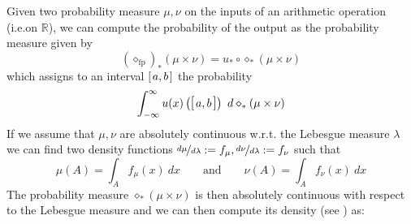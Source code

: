 \documentclass[10pt,a4paper]{article}
\theoremstyle{plain}
\theoremstyle{definition}
\newcommand{\R}{\mathbb{R}}
\newcommand{\intvl}[1]{\mathlarger{\left[\right.}  #1 \mathlarger{\left.\right]}}
\newcommand{\fp}{_{\mathrm{fp}}}
\begin{document}
Given two probability measure $\mu,\nu$ on the inputs of an arithmetic operation (i.e.\@ on $\R$), we can compute the probability of the output as the probability measure given by
\[
(\diamond\fp)_\ast(\mu\times\nu)=u_\ast\circ \diamond_\ast (\mu\times \nu)
\]
which assigns to an interval $\intvl{a,b}$ the probability
\begin{equation}\label{eq:noisyoperation}
\int_{-\infty}^{\infty} u(x)\left(\intvl{a,b}\right) ~d\diamond_\ast(\mu\times \nu)
\end{equation}
If we assume that $\mu,\nu$ are absolutely continuous w.r.t. the Lebesgue measure $\lambda$ we can find two density functions $\nicefrac{d\mu}{d\lambda}:=f_\mu,\nicefrac{d\nu}{d\lambda}:=f_\nu$ such that
\[
\mu(A)=\int_A f_\mu(x)~dx\qquad\text{and}\qquad\nu(A)=\int_A f_\nu(x)~dx
\]
The probability measure $\diamond_\ast(\mu\times \nu)$ is then absolutely continuous with respect to the Lebesgue measure and we can then compute its density (see \cite{springer1979algebra}) as:
\end{document}

